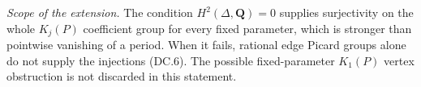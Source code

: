 \emph{Scope of the extension.}
The condition $H^2(\Delta,\mathbf Q)=0$ supplies surjectivity on
the whole $K_j(P)$ coefficient group for every fixed parameter,
which is stronger than pointwise vanishing of a period.
When it fails, rational edge Picard groups alone do not supply
the injections (DC.6). The possible fixed-parameter $K_1(P)$
vertex obstruction is not discarded in this statement.

